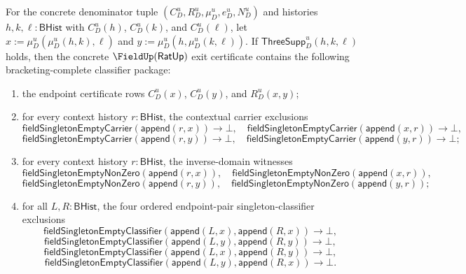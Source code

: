 \begin{theorem}
\label{thm:ratup-fieldup-bracketing-complete-classifier-exit-certificate}
For the concrete denominator tuple $(C_D^u,R_D^u,\mu_D^u,e_D^u,N_D^u)$ and
histories $h,k,\ell:\mathsf{BHist}$ with $C_D^u(h)$, $C_D^u(k)$, and
$C_D^u(\ell)$, let $x:=\mu_D^u(\mu_D^u(h,k),\ell)$ and
$y:=\mu_D^u(h,\mu_D^u(k,\ell))$. If
$\mathsf{ThreeSupp}_D^u(h,k,\ell)$ holds, then the concrete
$\FieldUp(\mathsf{RatUp})$ exit certificate contains the following
bracketing-complete classifier package:
\begin{enumerate}
  \item the endpoint certificate rows $C_D^u(x)$, $C_D^u(y)$, and
  $R_D^u(x,y)$;
  \item for every context history $r:\mathsf{BHist}$, the contextual carrier
  exclusions
  $$
  \mathsf{fieldSingletonEmptyCarrier}(\mathsf{append}(r,x))\to\bot,\quad
  \mathsf{fieldSingletonEmptyCarrier}(\mathsf{append}(x,r))\to\bot,
  $$
  $$
  \mathsf{fieldSingletonEmptyCarrier}(\mathsf{append}(r,y))\to\bot,\quad
  \mathsf{fieldSingletonEmptyCarrier}(\mathsf{append}(y,r))\to\bot;
  $$
  \item for every context history $r:\mathsf{BHist}$, the inverse-domain
  witnesses
  $$
  \mathsf{fieldSingletonEmptyNonZero}(\mathsf{append}(r,x)),\quad
  \mathsf{fieldSingletonEmptyNonZero}(\mathsf{append}(x,r)),
  $$
  $$
  \mathsf{fieldSingletonEmptyNonZero}(\mathsf{append}(r,y)),\quad
  \mathsf{fieldSingletonEmptyNonZero}(\mathsf{append}(y,r));
  $$
  \item for all $L,R:\mathsf{BHist}$, the four ordered endpoint-pair
  singleton-classifier exclusions
  $$
  \mathsf{fieldSingletonEmptyClassifier}(\mathsf{append}(L,x),\mathsf{append}(R,x))
  \to\bot,
  $$
  $$
  \mathsf{fieldSingletonEmptyClassifier}(\mathsf{append}(L,y),\mathsf{append}(R,y))
  \to\bot,
  $$
  $$
  \mathsf{fieldSingletonEmptyClassifier}(\mathsf{append}(L,x),\mathsf{append}(R,y))
  \to\bot,
  $$
  $$
  \mathsf{fieldSingletonEmptyClassifier}(\mathsf{append}(L,y),\mathsf{append}(R,x))
  \to\bot.
  $$
\end{enumerate}
\end{theorem}
